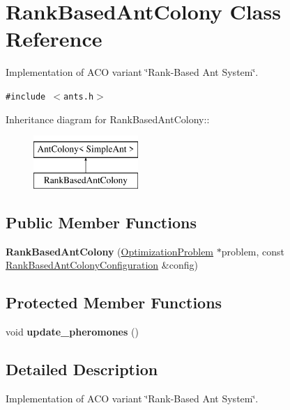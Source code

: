 \hypertarget{classRankBasedAntColony}{
\section{RankBasedAntColony Class Reference}
\label{classRankBasedAntColony}
}
Implementation of ACO variant \char`\"{}Rank-Based Ant System\char`\"{}.  


{\tt \#include $<$ants.h$>$}

Inheritance diagram for RankBasedAntColony::\begin{figure}[H]
\begin{center}
\leavevmode
\includegraphics[height=2cm]{classRankBasedAntColony}
\end{center}
\end{figure}
\subsection*{Public Member Functions}
\begin{CompactItemize}
\item 
\hypertarget{classRankBasedAntColony_0ec025ae5d69d70df55e3f56a72cb1bf}{
\textbf{RankBasedAntColony} (\hyperlink{classOptimizationProblem}{OptimizationProblem} $\ast$problem, const \hyperlink{classRankBasedAntColonyConfiguration}{RankBasedAntColonyConfiguration} \&config)}
\label{classRankBasedAntColony_0ec025ae5d69d70df55e3f56a72cb1bf}

\end{CompactItemize}
\subsection*{Protected Member Functions}
\begin{CompactItemize}
\item 
\hypertarget{classRankBasedAntColony_8a8d216e2eb181372dea9045755b8012}{
void \textbf{update\_\-pheromones} ()}
\label{classRankBasedAntColony_8a8d216e2eb181372dea9045755b8012}

\end{CompactItemize}


\subsection{Detailed Description}
Implementation of ACO variant \char`\"{}Rank-Based Ant System\char`\"{}. 

